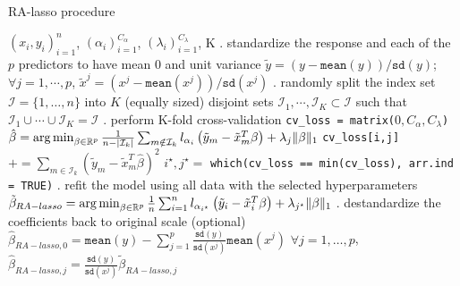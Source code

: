 \begin{algorithm}
\caption{RA-lasso procedure}\label{alg:ralasso}
\begin{algorithmic}
\Require $(x_i, y_i)_{i=1}^n$, $(\alpha_i)_{i=1}^{C_\alpha}$, $(\lambda_i)_{i=1}^{C_\lambda}$, K
. standardize the response and each of the $p$ predictors to have mean $0$ and unit variance
\State \quad $\tilde{y} = ( y - \texttt{mean}(y) ) / \texttt{sd}(y)$;
\State \quad $\forall j=1,\cdots,p$, \quad $\tilde{x}^j = ( x^j - \texttt{mean}(x^j) ) / \texttt{sd}(x^j)$
. randomly split the index set $\mathcal{I} = \{1,\dots,n\}$ into $K$ (equally sized) disjoint sets
\State \quad $\mathcal{I}_1, \cdots, \mathcal{I}_K \subset \mathcal{I}$ such that $\mathcal{I}_1 \cup \cdots \cup \mathcal{I}_K = \mathcal{I}$
. perform K-fold cross-validation
\State \quad \texttt{cv\_loss = matrix(}$0, C_\alpha, C_\lambda$\texttt{)}
\Indent
				\State $\hat{\beta} = \argmin_{\beta\in\mathbb{R}^p} 
						\frac{1}{n - |\mathcal{I}_k|}\sum_{m \notin \mathcal{I}_k} l_{\alpha_i} 
						\left( \tilde{y}_m - \tilde{x}_m^T\beta \right) + \lambda_j\|\beta\|_1$
				\State \texttt{cv\_loss[i,j]} $+= \sum_{m \in \mathcal{I}_k} 
												\left( \tilde{y}_m - \tilde{x}_m^T\hat{\beta} \right)^2$
			\EndFor
		\EndFor
	\EndFor
\EndIndent
\State \quad $i^\star, j^\star=$ \texttt{which(cv\_loss == min(cv\_loss), arr.ind = TRUE)}
. refit the model using all data with the selected hyperparameters
\State \quad $\tilde{\beta}_{RA-lasso} = \argmin_{\beta\in\mathbb{R}^p} \frac{1}{n}\sum_{i=1}^n l_{\alpha_{i^\star}} \left( \tilde{y}_i - \tilde{x}_i^T\beta \right) + \lambda_{j^\star}\|\beta\|_1$
. destandardize the coefficients back to original scale (optional)
\State \quad $\hat{\beta}_{RA-lasso, 0} = \texttt{mean}(y) - \sum_{j=1}^p \frac{\texttt{sd}(y)}{\texttt{sd}(x^j)}\texttt{mean}(x^j)$ 
\State \quad $\forall j = 1,\dots,p$, \quad $\hat{\beta}_{RA-lasso, j} = \frac{\texttt{sd}(y)}{\texttt{sd}(x^j)}\tilde{\beta}_{RA-lasso, j}$ 
\end{algorithmic}
\end{algorithm}